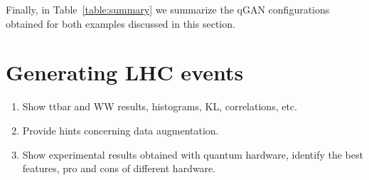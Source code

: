 \documentclass[twocolumn,preprintnumbers,superscriptaddress]{revtex4-2}
\begin{document}
Finally, in Table~\ref{table:summary} we summarize the qGAN configurations
obtained for both examples discussed in this section.

\section{Generating LHC events}
\label{sec:lhc}

\begin{enumerate}
  \item Show ttbar and WW results, histograms, KL, correlations, etc.
  \item Provide hints concerning data augmentation.
  \item Show experimental results obtained with quantum hardware, identify the
        best features, pro and cons of different hardware.
\end{enumerate}



\end{document}
